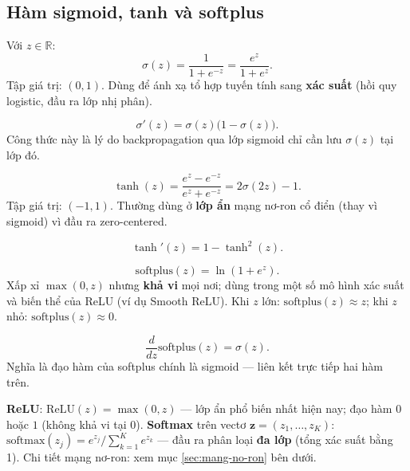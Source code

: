 \documentclass[12pt,a4paper]{article}
\begin{document}
\subsection{Hàm sigmoid, tanh và softplus}

\begin{dinhnghia}[title={Hàm sigmoid (logistic)}]
  Với $z \in \mathbb{R}$:
  \[
    \sigma(z) = \frac{1}{1 + e^{-z}} = \frac{e^z}{1 + e^z}.
  \]
  Tập giá trị: $(0,1)$. Dùng để ánh xạ tổ hợp tuyến tính sang \textbf{xác suất} (hồi quy logistic, đầu ra lớp nhị phân).
\end{dinhnghia}

\begin{congthuc}[title={Đạo hàm sigmoid (chain rule)}]
  \[
    \sigma'(z) = \sigma(z)\bigl(1 - \sigma(z)\bigr).
  \]
  Công thức này là lý do backpropagation qua lớp sigmoid chỉ cần lưu $\sigma(z)$ tại lớp đó.
\end{congthuc}

\begin{dinhnghia}[title={Hàm tanh (hyperbolic tangent)}]
  \[
    \tanh(z) = \frac{e^z - e^{-z}}{e^z + e^{-z}} = 2\sigma(2z) - 1.
  \]
  Tập giá trị: $(-1,1)$. Thường dùng ở \textbf{lớp ẩn} mạng nơ-ron cổ điển (thay vì sigmoid) vì đầu ra zero-centered.
\end{dinhnghia}

\begin{congthuc}[title={Đạo hàm tanh}]
  \[
    \tanh'(z) = 1 - \tanh^2(z).
  \]
\end{congthuc}

\begin{dinhnghia}[title={Hàm softplus}]
  \[
    \mathrm{softplus}(z) = \ln(1 + e^{z}).
  \]
  Xấp xỉ $\max(0,z)$ nhưng \textbf{khả vi} mọi nơi; dùng trong một số mô hình xác suất và biến thể của ReLU (ví dụ Smooth ReLU).
  Khi $z$ lớn: $\mathrm{softplus}(z) \approx z$; khi $z$ nhỏ: $\mathrm{softplus}(z) \approx 0$.
\end{dinhnghia}

\begin{congthuc}[title={Đạo hàm softplus}]
  \[
    \frac{d}{dz}\mathrm{softplus}(z) = \sigma(z).
  \]
  Nghĩa là đạo hàm của softplus chính là sigmoid --- liên kết trực tiếp hai hàm trên.
\end{congthuc}

\begin{luuy}[title={ReLU và softmax (tóm tắt)}]
  \textbf{ReLU}: $\mathrm{ReLU}(z) = \max(0,z)$ --- lớp ẩn phổ biến nhất hiện nay; đạo hàm $0$ hoặc $1$ (không khả vi tại $0$).
  \textbf{Softmax} trên vectơ $\mathbf{z} = (z_1,\ldots,z_K)$:
  $\mathrm{softmax}(z_j) = e^{z_j} / \sum_{k=1}^K e^{z_k}$ --- đầu ra phân loại \textbf{đa lớp} (tổng xác suất bằng 1).
  Chi tiết mạng nơ-ron: xem mục \ref{sec:mang-no-ron} bên dưới.
\end{luuy}
\end{document}
